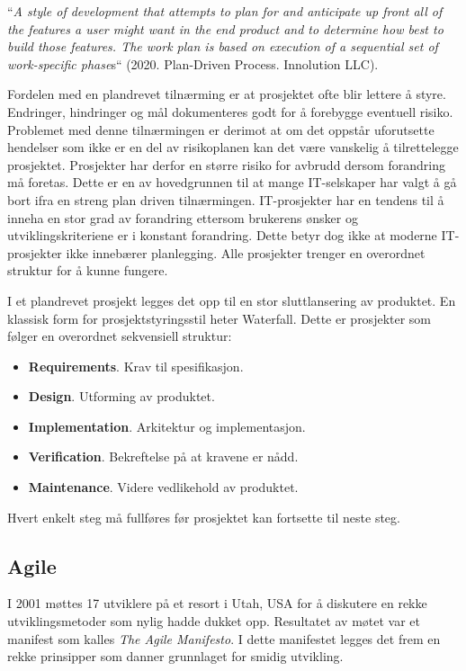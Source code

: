  ``\textit{A style of development that attempts to plan for and anticipate up front all of the features a user might want in the end product and to determine how best to build those features. The work plan is based on execution of a sequential set of work-specific phase}s`` (2020. Plan-Driven Process. Innolution LLC).  

Fordelen med en plandrevet tilnærming er at prosjektet ofte blir lettere å styre. Endringer, hindringer og mål dokumenteres godt for å forebygge eventuell risiko. Problemet med denne tilnærmingen er derimot at om det oppstår uforutsette hendelser som ikke er en del av risikoplanen kan det være vanskelig å tilrettelegge prosjektet. Prosjekter har derfor en større risiko for avbrudd dersom forandring må foretas. Dette er en av hovedgrunnen til at mange IT-selskaper har valgt å gå bort ifra en streng plan driven tilnærmingen. IT-prosjekter har en tendens til å inneha en stor grad av forandring ettersom brukerens ønsker og utviklingskriteriene er i konstant forandring. Dette betyr dog ikke at moderne IT-prosjekter ikke innebærer planlegging. Alle prosjekter trenger en overordnet struktur for å kunne fungere. 

I et plandrevet prosjekt legges det opp til en stor sluttlansering av produktet. En klassisk form for prosjektstyringsstil heter Waterfall. Dette er prosjekter som følger en overordnet sekvensiell struktur:
\begin{itemize}
    \item \textbf{Requirements}. Krav til spesifikasjon.
    \item \textbf{Design}. Utforming av produktet.
    \item \textbf{Implementation}. Arkitektur og implementasjon.
    \item \textbf{Verification}. Bekreftelse på at kravene er nådd.
    \item \textbf{Maintenance}. Videre vedlikehold av produktet.
\end{itemize}
Hvert enkelt steg må fullføres før prosjektet kan fortsette til neste steg.    

\subsection{\textbf{Agile}}
I 2001 møttes 17 utviklere på et resort i Utah, USA for å diskutere en rekke utviklingsmetoder som nylig hadde dukket opp. Resultatet av møtet var et manifest som kalles \textit{The Agile Manifesto}. I dette manifestet legges det frem en rekke prinsipper som danner grunnlaget for smidig utvikling.

